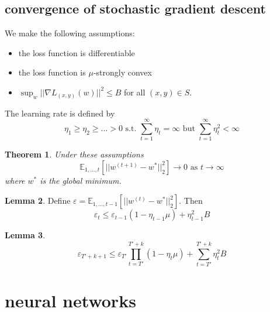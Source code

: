 \documentclass[a4paper, 12pt]{article}
\theoremstyle{plain}
\newtheorem{theorem}{Theorem}[subsection] %
\theoremstyle{definition}
\theoremstyle{lemma}
\newtheorem{lemma}[theorem]{Lemma}
\theoremstyle{remark}
\theoremstyle{example}
\begin{document}
	\subsection{convergence of stochastic gradient descent}
	We make the following assumptions: \begin{itemize}
		\item the loss function is differentiable
		\item the loss function is $\mu$-strongly convex
		\item $\sup_{w} ||\nabla L_{(x,y)}(w)||^2 \leq B$ for all $(x,y) \in S$.
	\end{itemize}
	The learning rate is defined by \[\eta_1 \geq \eta_2 \geq ... > 0 \text{ s.t. } \sum_{t=1}^\infty \eta_t = \infty \text{ but } \sum_{t=1}^\infty \eta_t^2 < \infty\]
	\begin{theorem}
		Under these assumptions \[\mathbb{E}_{1,...,t} [||w^{(t+1)} - w^*||_2^2] \to 0 \text{ as } t \to \infty\] where $w^*$ is the global minimum.
	\end{theorem}
	\begin{lemma}
		Define $\varepsilon = \mathbb{E}_{1,...,t-1} [||w^{(t)} - w^*||_2^2]$. Then \[\varepsilon_t \leq \varepsilon_{t-1}(1-\eta_{t-1}\mu) + \eta_{t-1}^2B\]
	\end{lemma}
	\begin{lemma}
		\[\varepsilon_{T'+k+1}\leq \varepsilon_{T'}\prod_{t=T'}^{T'+k}(1-\eta_t\mu) + \sum_{t=T'}^{T'+k}\eta_t^2B\]
	\end{lemma}
	\section{neural networks}
\end{document}
